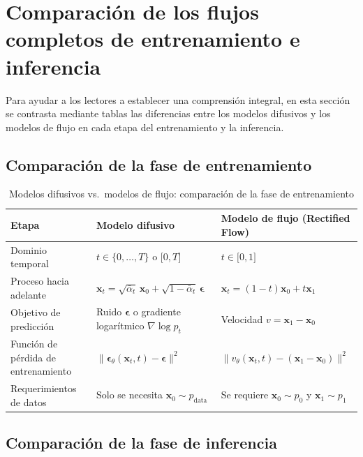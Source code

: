 \section{Comparación de los flujos completos de entrenamiento e inferencia}

Para ayudar a los lectores a establecer una comprensión integral, en esta sección se contrasta mediante tablas las diferencias entre los modelos difusivos y los modelos de flujo en cada etapa del entrenamiento y la inferencia.

\subsection{Comparación de la fase de entrenamiento}

\begin{table}[H]
\centering
\caption{Modelos difusivos vs.\ modelos de flujo: comparación de la fase de entrenamiento}
\begin{tabular}{@{} p{3.8cm} p{5cm} p{5cm} @{}}
\toprule
\textbf{Etapa} & \textbf{Modelo difusivo} & \textbf{Modelo de flujo (Rectified Flow)} \\
\midrule
Dominio temporal & $t \in \{0, \ldots, T\}$ o ${[}0, T{]}$ & $t \in {[}0, 1{]}$ \\
Proceso hacia adelante & $\mathbf{x}_t = \sqrt{\bar\alpha_t}\,\mathbf{x}_0 + \sqrt{1-\bar\alpha_t}\,\boldsymbol{\epsilon}$ & $\mathbf{x}_t = (1-t)\mathbf{x}_0 + t\mathbf{x}_1$ \\
Objetivo de predicción & Ruido $\boldsymbol{\epsilon}$ o gradiente logarítmico $\nabla\log p_t$ & Velocidad $v = \mathbf{x}_1 - \mathbf{x}_0$ \\
Función de pérdida de entrenamiento & $\|\boldsymbol{\epsilon}_\theta(\mathbf{x}_t,t) - \boldsymbol{\epsilon}\|^2$ & $\|v_\theta(\mathbf{x}_t,t) - (\mathbf{x}_1-\mathbf{x}_0)\|^2$ \\
Requerimientos de datos & Solo se necesita $\mathbf{x}_0 \sim p_{\text{data}}$ & Se requiere $\mathbf{x}_0 \sim p_0$ y $\mathbf{x}_1 \sim p_1$ \\
\bottomrule
\end{tabular}
\end{table}

\subsection{Comparación de la fase de inferencia}

